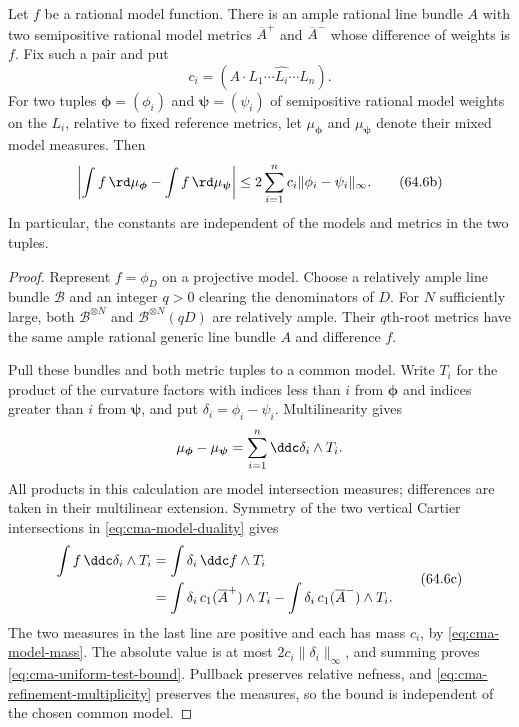 \begin{proposition}\label{prop:cma-uniform-test-bound}
Let $f$ be a rational model function. There is an ample rational line bundle $A$ with two semipositive rational model metrics $\overline A^+$ and $\overline A^-$ whose difference of weights is $f$. Fix such a pair and put
\[
               c_i=(A\cdot L_1\cdots\widehat{L_i}\cdots L_n).
\]
For two tuples $\boldsymbol\phi=(\phi_i)$ and $\boldsymbol\psi=(\psi_i)$ of semipositive rational model weights on the $L_i$, relative to fixed reference metrics, let $\mu_{\boldsymbol\phi}$ and $\mu_{\boldsymbol\psi}$ denote their mixed model measures. Then
\[
 \left|\int f\,\rd\mu_{\boldsymbol\phi}
              -\int f\,\rd\mu_{\boldsymbol\psi}\right|
 \leq 2\sum_{i=1}^n c_i\|\phi_i-\psi_i\|_\infty.
\tag{64.6b}\label{eq:cma-uniform-test-bound}
\]
In particular, the constants are independent of the models and metrics in the two tuples.
\end{proposition}

\begin{proof}
Represent $f=\phi_D$ on a projective model. Choose a relatively ample line bundle $\mathcal B$ and an integer $q>0$ clearing the denominators of $D$. For $N$ sufficiently large, both $\mathcal B^{\otimes N}$ and $\mathcal B^{\otimes N}(qD)$ are relatively ample. Their $q$th-root metrics have the same ample rational generic line bundle $A$ and difference $f$.

Pull these bundles and both metric tuples to a common model. Write $T_i$ for the product of the curvature factors with indices less than $i$ from $\boldsymbol\phi$ and indices greater than $i$ from $\boldsymbol\psi$, and put $\delta_i=\phi_i-\psi_i$. Multilinearity gives
\[
 \mu_{\boldsymbol\phi}-\mu_{\boldsymbol\psi}
       =\sum_{i=1}^n\ddc\delta_i\wedge T_i.
\]
All products in this calculation are model intersection measures; differences are taken in their multilinear extension. Symmetry of the two vertical Cartier intersections in \eqref{eq:cma-model-duality} gives
\[
 \begin{split}
 \int f\,\ddc\delta_i\wedge T_i
   &=\int\delta_i\,\ddc f\wedge T_i\\
   &=\int\delta_i\,c_1(\overline A^+)\wedge T_i
      -\int\delta_i\,c_1(\overline A^-)\wedge T_i.
 \end{split}
\tag{64.6c}\label{eq:cma-model-integration-by-parts}
\]
The two measures in the last line are positive and each has mass $c_i$, by \eqref{eq:cma-model-mass}. The absolute value is at most $2c_i\|\delta_i\|_\infty$, and summing proves \eqref{eq:cma-uniform-test-bound}. Pullback preserves relative nefness, and \eqref{eq:cma-refinement-multiplicity} preserves the measures, so the bound is independent of the chosen common model.
\end{proof}

